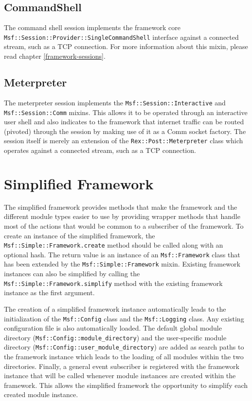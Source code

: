 \documentclass{report}
\begin{document}
        \subsection{CommandShell}

\par
The command shell session implements the framework core \\
\texttt{Msf::Session::Provider::SingleCommandShell} interface
against a connected stream, such as a TCP connection.  For more
information about this mixin, please read chapter
\ref{framework-sessions}.

        \subsection{Meterpreter}

\par
The meterpreter session implements the
\texttt{Msf::Session::Interactive} and \\
\texttt{Msf::Session::Comm}
mixins.  This allows it to be operated through an interactive user
shell and also indicates to the framework that internet traffic can
be routed (pivoted) through the session by making use of it as a
Comm socket factory.  The session itself is merely an extension of
the \texttt{Rex::Post::Meterpreter} class which operates against a
connected stream, such as a TCP connection.

    \section{Simplified Framework}

\par
The simplified framework provides methods that make the framework
and the different module types easier to use by providing wrapper
methods that handle most of the actions that would be common to a
subscriber of the framework.  To create an instance of the
simplified framework, the \texttt{Msf::Simple::Framework.create}
method should be called along with an optional hash.  The return
value is an instance of an \texttt{Msf::Framework} class that has
been extended by the \texttt{Msf::Simple::Framework} mixin. Existing
framework instances can also be simplified by calling the
\texttt{Msf::Simple::Framework.simplify} method with the existing
framework instance as the first argument.

\par
The creation of a simplified framework instance automatically leads
to the initialization of the \texttt{Msf::Config} class and the
\texttt{Msf::Logging} class.  Any existing configuration file is
also automatically loaded.  The default global module directory
(\texttt{Msf::Config::module\_directory}) and the user-specific
module directory (\texttt{Msf::Config::user\_module\_directory}) are
added as search paths to the framework instance which leads to the
loading of all modules within the two directories.  Finally, a
general event subscriber is registered with the framework instance
that will be called whenever module instances are created within the
framework.  This allows the simplified framework the opportunity to
simplify each created module instance.
\end{document}
